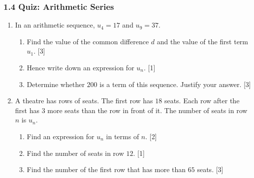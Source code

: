 \documentclass[12pt, twoside]{article}
\begin{document}
\subsubsection*{1.4 Quiz: Arithmetic Series}

\begin{enumerate}[itemsep=0.15cm]

\item[1.] [Maximum mark: 7]

In an arithmetic sequence, $u_{4} = 17$ and $u_{9} = 37$.

\begin{enumerate}[itemsep=0.1cm]
  \item Find the value of the common difference $d$ and the value of
  the first term $u_{1}$. \hfill [3]
  \item Hence write down an expression for $u_{n}$. \hfill [1]
  \item Determine whether $200$ is a term of this sequence. Justify
  your answer. \hfill [3]
\end{enumerate}


\newpage

\item[2.] [Maximum mark: 6]

A theatre has rows of seats. The first row has $18$ seats. Each row
after the first has $3$ more seats than the row in front of it. The
number of seats in row $n$ is $u_{n}$.

\begin{enumerate}[itemsep=0.1cm]
  \item Find an expression for $u_{n}$ in terms of $n$. \hfill [2]
  \item Find the number of seats in row $12$. \hfill [1]
  \item Find the number of the first row that has more than $65$
  seats. \hfill [3]
\end{enumerate}


\end{enumerate}
\end{document}
